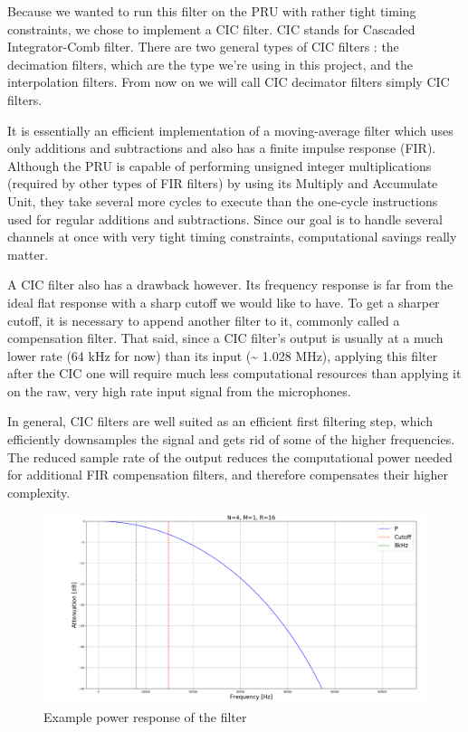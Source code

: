 \documentclass[]{report}
\begin{document}
Because we wanted to run this filter on the PRU with rather tight timing
constraints, we chose to implement a CIC filter. CIC stands for Cascaded
Integrator-Comb filter. There are two general types of CIC filters : the
decimation filters, which are the type we're using in this project, and
the interpolation filters. From now on we will call CIC decimator
filters simply CIC filters.

It is essentially an efficient implementation of a moving-average filter
which uses only additions and subtractions and also has a finite impulse
response (FIR). Although the PRU is capable of performing unsigned
integer multiplications (required by other types of FIR filters) by
using its Multiply and Accumulate Unit, they take several more cycles to
execute than the one-cycle instructions used for regular additions and
subtractions. Since our goal is to handle several channels at once with
very tight timing constraints, computational savings really matter.

A CIC filter also has a drawback however. Its frequency response is far
from the ideal flat response with a sharp cutoff we would like to have.
To get a sharper cutoff, it is necessary to append another filter to it,
commonly called a compensation filter. That said, since a CIC filter's
output is usually at a much lower rate (64 kHz for now) than its input
(\textasciitilde{} 1.028 MHz), applying this filter after the CIC one
will require much less computational resources than applying it on the
raw, very high rate input signal from the microphones.

In general, CIC filters are well suited as an efficient first filtering
step, which efficiently downsamples the signal and gets rid of some of
the higher frequencies. The reduced sample rate of the output reduces
the computational power needed for additional FIR compensation filters,
and therefore compensates their higher complexity.

\begin{figure}
\centering
\includegraphics[width=0.9\linewidth]{Pictures/CIC_power_resp.png}
\caption{Example power response of the filter}
\end{figure}
\end{document}

